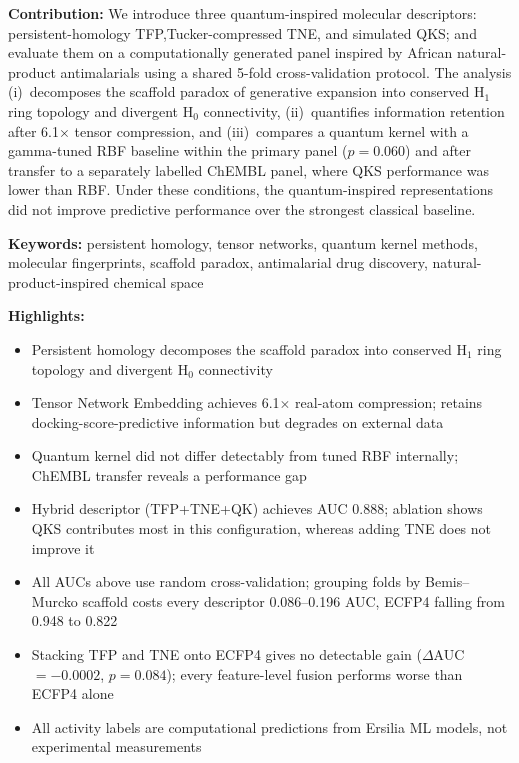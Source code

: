 \documentclass[11pt,a4paper]{article}
\begin{document}
\noindent\textbf{Contribution:} We introduce three quantum-inspired molecular descriptors: persistent-homology TFP,Tucker-compressed TNE, and simulated QKS; and evaluate them on a computationally generated panel inspired by African natural-product antimalarials using a shared 5-fold cross-validation protocol. The analysis (i)~decomposes the scaffold paradox of generative expansion into conserved H$_1$ ring topology and divergent H$_0$ connectivity, (ii)~quantifies information retention after \num{6.1}$\times$ tensor compression, and (iii)~compares a quantum kernel with a gamma-tuned RBF baseline within the primary panel ($p = \num{0.060}$) and after transfer to a separately labelled ChEMBL panel, where QKS performance was lower than RBF. Under these conditions, the quantum-inspired representations did not improve predictive performance over the strongest classical baseline.

\noindent\textbf{Keywords:} persistent homology, tensor networks, quantum kernel methods, molecular fingerprints, scaffold paradox, antimalarial drug discovery, natural-product-inspired chemical space

\noindent\textbf{Highlights:}
\begin{itemize}
\item Persistent homology decomposes the scaffold paradox into conserved H$_1$ ring topology and divergent H$_0$ connectivity
\item Tensor Network Embedding achieves \num{6.1}$\times$ real-atom compression; retains docking-score-predictive information but degrades on external data
\item Quantum kernel did not differ detectably from tuned RBF internally; ChEMBL transfer reveals a performance gap
\item Hybrid descriptor (TFP+TNE+QK) achieves AUC \num{0.888}; ablation shows QKS contributes most in this configuration, whereas adding TNE does not improve it
\item All AUCs above use random cross-validation; grouping folds by Bemis--Murcko scaffold costs every descriptor \numrange{0.086}{0.196} AUC, ECFP4 falling from \num{0.948} to \num{0.822}
\item Stacking TFP and TNE onto ECFP4 gives no detectable gain ($\Delta$AUC $= \num{-0.0002}$, $p = \num{0.084}$); every feature-level fusion performs worse than ECFP4 alone
\item All activity labels are computational predictions from Ersilia ML models, not experimental measurements
\end{itemize}
\end{document}

